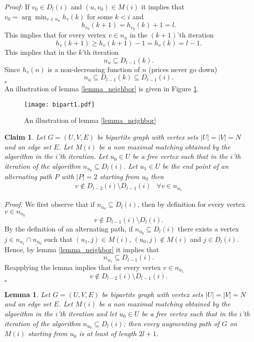 \documentclass[11pt,onecolumn]{article}
\newcounter{theorem}
\newtheorem{lemma}[theorem]{Lemma}
\newtheorem{claim}[theorem]{Claim}
\newcounter{definition}
\newcommand{\beq}{\begin{equation}}
\newcommand{\eeq}{\end{equation}}
\newcommand{\bea}{\begin{array}}
\newcommand{\ena}{\end{array}}
\newcommand{\nin}{{\not \in}}
\newenvironment{proof}{\textit{Proof:}}{\hfill$\square$\\}
\begin{document}
\begin{proof}
If $v_0\in D_l(i)$ and $(u,v_0)\in M(i)$ it implies that $\displaystyle v_0=\arg\min_{v\in n_u} h_v(k)$ for some $k<i$ and
\beq
h_{v_0}(k+1)=h_{v_0}(k)+1=l.
\eeq
This implies that for every vertex $v\in n_u$ in the $(k+1)$'th iteration
\beq
h_{v}(k+1)\geq h_v(k+1)-1=h_v(k)=l-1.
\eeq
This implies that in the $k$'th iteration
\beq
n_u\subseteq D_{l-1}(k).
\eeq
Since $h_v(n)$ is a non-decreasing function of $n$ (prices never go down)
\beq
n_u\subseteq D_{l-1}(k)\subseteq D_{l-1}(i).
\eeq
\end{proof}
An illustration of lemma \ref{lemma_neighbor} is given in Figure \ref{figure_neghbor}.
\begin{figure}[htbp]
\centering \texttt{[image: bipart1.pdf]}
\caption{An illustration of lemma \ref{lemma_neighbor} }
\label{figure_neghbor}
\end{figure}
\begin{claim}
\label{lemma_dl_1} Let $G=(U,V,E)$ be bipartite graph with vertex sets $|U|=|V|=N$ and an edge set $E$. Let $M(i)$ be a non maximal matching obtained by the algorithm in the $i$'th iteration. Let $u_0\in U$ be a free vertex such that in the $i$'th iteration of the algorithm $n_{u_0}\subseteq D_l(i)$. Let $u_1\in U$ be the end point of an alternating path $P$ with $|P|=2$ starting from $u_0$ then
\beq
\bea{ll}
v\not\in D_{l-2}(i)\setminus D_{l-1}(i)& \forall v\in n_{u_{1}}
\ena
\eeq
\end{claim}
\begin{proof}
We first observe that if $n_{u_0}\subseteq D_l(i)$, then by definition for every vertex $v\in n_{u_0}$
\beq
v\not\in D_{l-1}(i)\setminus D_{l}(i).
\eeq
By the definition of an alternating path, if $n_{u_0}\subseteq D_l(i)$ there exists a vertex $j\in n_{u_{1}} \cap n_{u_{0}}$ such that $(u_{1},j)\in M(i)$, $(u_{0},j)\nin M(i)$ and $j \in D_l(i) $.
Hence, by lemma \ref{lemma_neighbor} it implies that
\beq
n_{u_{1}}\subseteq D_{l-1}(i).
\eeq
Reapplying the lemma implies that for every vertex $v\in n_{u_{1}}$
\beq
v\not\in D_{l-2}(i)\setminus D_{l-1}(i).
\eeq
\end{proof}


\begin{lemma}
\label{lemma_max_h} Let $G=(U,V,E)$ be bipartite graph with vertex sets $|U|=|V|=N$ and an edge set $E$. Let $M(i)$ be a non maximal matching obtained by the algorithm in the $i$'th iteration and let $u_0\in U$ be a free vertex such that in the $i$'th iteration of the algorithm $n_{u_0}\subseteq D_l(i)$;  then every augmenting path of $G$ on $M(i)$ starting from $u_0$ is at least of length $2l+1$.
\end{lemma}
\end{document}
